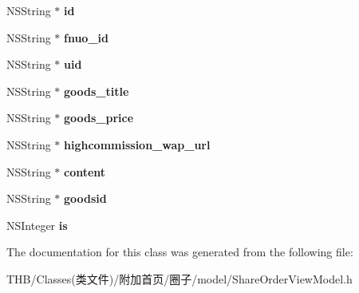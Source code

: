\begin{DoxyCompactItemize}
N\+S\+String $\ast$ {\bfseries id}
\item 
\mbox{\label{interface_share_order_view_model_a9a90c4124fe1f597b70b77845970c7f5}} 
N\+S\+String $\ast$ {\bfseries fnuo\+\_\+id}
\item 
\mbox{\label{interface_share_order_view_model_a56606012211cdb85c5e67b62ed92d932}} 
N\+S\+String $\ast$ {\bfseries uid}
\item 
\mbox{\label{interface_share_order_view_model_a9a0c2cf2afe26ec35a467e9874de6cf4}} 
N\+S\+String $\ast$ {\bfseries goods\+\_\+title}
\item 
\mbox{\label{interface_share_order_view_model_a4c55e252fbde60559fe4a220d006255e}} 
N\+S\+String $\ast$ {\bfseries goods\+\_\+price}
\item 
\mbox{\label{interface_share_order_view_model_a50b3cae863a26324b96f322c7b169e0a}} 
N\+S\+String $\ast$ {\bfseries highcommission\+\_\+wap\+\_\+url}
\item 
\mbox{\label{interface_share_order_view_model_a7e57ad57a55549141c7df987dfa79c99}} 
N\+S\+String $\ast$ {\bfseries content}
\item 
\mbox{\label{interface_share_order_view_model_a397be3e17870e26fa236e3a0942d6246}} 
N\+S\+String $\ast$ {\bfseries goodsid}
\item 
\mbox{\label{interface_share_order_view_model_a4ed3d8dee756a4007423167e40c187b1}} 
N\+S\+Integer {\bfseries is}
\end{DoxyCompactItemize}


The documentation for this class was generated from the following file\+:\begin{DoxyCompactItemize}
\item 
T\+H\+B/\+Classes(类文件)/附加首页/圈子/model/Share\+Order\+View\+Model.\+h\end{DoxyCompactItemize}
